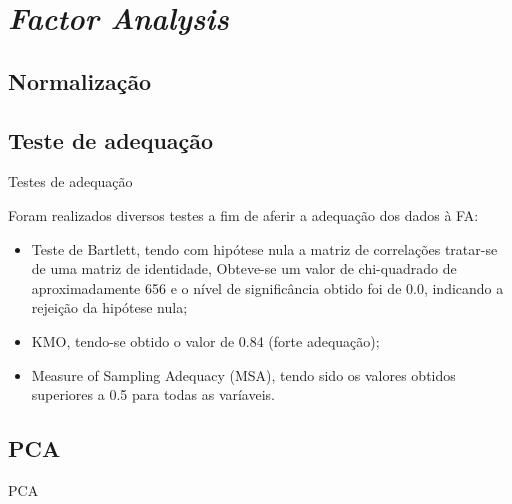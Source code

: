 \documentclass[xcolor=dvipsnames,table]{beamer}
\begin{document}
	\section{\textit{Factor Analysis}}
	\subsection{Normalização}
	\subsection{Teste de adequação}
	\begin{frame} {Testes de adequação}
	
	Foram realizados diversos testes a fim de aferir a adequação dos dados à FA:
	
	\begin{itemize}
	\item Teste de Bartlett, tendo com hipótese nula a matriz de correlações tratar-se de uma matriz de identidade, Obteve-se um valor de chi-quadrado de aproximadamente 656 e o nível de significância obtido foi de 0.0, indicando a rejeição da hipótese nula;
	\item KMO, tendo-se obtido o valor de 0.84 (forte adequação);
	
	\item Measure of Sampling Adequacy (MSA), tendo sido os valores obtidos superiores a 0.5 para todas as varíaveis. 
	\end{itemize}
	
	\end{frame}
	\subsection{PCA}
		\begin{frame}{PCA}
		\begin{table}[h]
        \centering
        \end{table}
	
	
	\end{frame}
	
\end{document}
